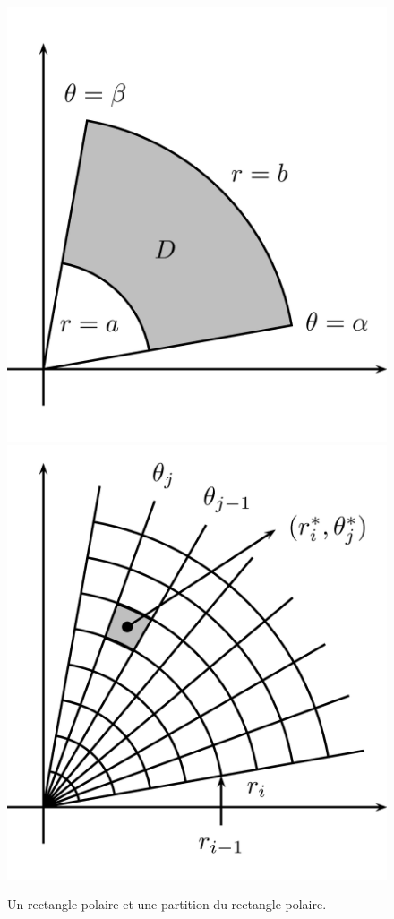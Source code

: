 \documentclass[]{book}
\theoremstyle{definition}
\theoremstyle{definition}
\theoremstyle{definition}
\theoremstyle{remark}
\begin{document}
\begin{figure}

{\centering \includegraphics[width=0.45\linewidth]{resources/images/latex/rectanglepolaire} \includegraphics[width=0.45\linewidth]{resources/images/latex/partitionrectpolaire} 

}

\caption{Un rectangle polaire et une partition du rectangle polaire.}\label{fig:partition-rectangle-polaire}
\end{figure}
\end{document}
